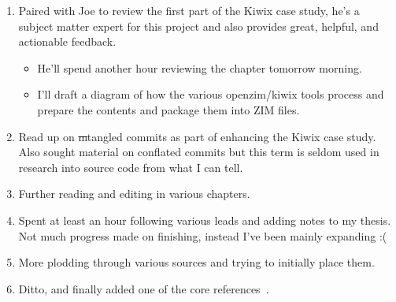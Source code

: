 \begin{enumerate}
    \item Paired with Joe to review the first part of the Kiwix case study, he's a subject matter expert for this project and also provides great, helpful, and actionable feedback.
    \begin{itemize}
        \item He'll spend another hour reviewing the chapter tomorrow morning.
        \item I'll draft a diagram of how the various openzim/kiwix tools process and prepare the contents and package them into ZIM files.
    \end{itemize}
    \item Read up on \sout{m}tangled commits as part of enhancing the Kiwix case study. Also sought material on conflated commits but this term is seldom used in research into source code from what I can tell.
    \item Further reading and editing in various chapters.
    \item Spent at least an hour following various leads and adding notes to my thesis. Not much progress made on finishing, instead I've been mainly expanding :(
    \item More plodding through various sources and trying to initially place them.
    \item Ditto, and finally added one of the core references~\citep{menzies2013_software_analytics_so_what}.
\end{enumerate}
